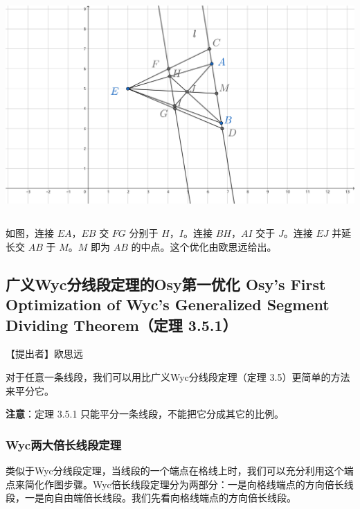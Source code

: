 \documentclass[UTF8]{article}
\begin{document}
\includegraphics[width=5.76806in,height=3.27847in]{media/image29.png}

如图，连接 \(EA\)，\(EB\) 交 \(FG\) 分别于 \(H\)，\(I\)。连接
\(BH\)，\(AI\) 交于 \(J\)。连接 \(EJ\) 并延长交 \(AB\) 于 \(M\)。\(M\)
即为 \(AB\) 的中点。这个优化由欧思远给出。

\hypertarget{ux5e7fux4e49wycux5206ux7ebfux6bb5ux5b9aux7406ux7684osyux7b2cux4e00ux4f18ux5316-osys-first-optimization-of-wycs-generalized-segment-dividing-theoremux5b9aux7406-3.5.1}{%
\subsection{广义Wyc分线段定理的Osy第一优化 Osy's First Optimization of
Wyc's Generalized Segment Dividing Theorem（定理
3.5.1）}\label{ux5e7fux4e49wycux5206ux7ebfux6bb5ux5b9aux7406ux7684osyux7b2cux4e00ux4f18ux5316-osys-first-optimization-of-wycs-generalized-segment-dividing-theoremux5b9aux7406-3.5.1}}

【提出者】欧思远

对于任意一条线段，我们可以用比广义Wyc分线段定理（定理
3.5）更简单的方法来平分它。

\textbf{注意}：定理 3.5.1 只能平分一条线段，不能把它分成其它的比例。

\hypertarget{wycux4e24ux5927ux500dux957fux7ebfux6bb5ux5b9aux7406}{%
\subsubsection{Wyc两大倍长线段定理}\label{wycux4e24ux5927ux500dux957fux7ebfux6bb5ux5b9aux7406}}

类似于Wyc分线段定理，当线段的一个端点在格线上时，我们可以充分利用这个端点来简化作图步骤。Wyc倍长线段定理分为两部分：一是向格线端点的方向倍长线段，一是向自由端倍长线段。我们先看向格线端点的方向倍长线段。
\end{document}
